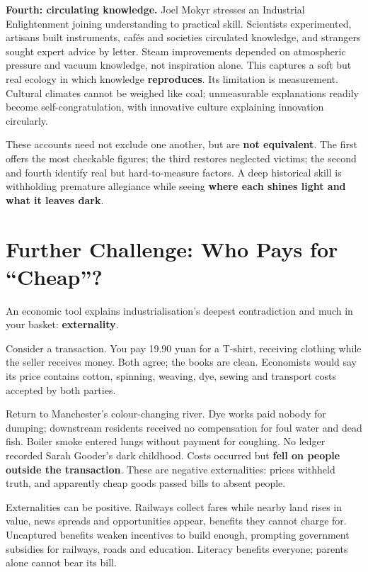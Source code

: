\textbf{Fourth: circulating knowledge.} Joel Mokyr stresses an Industrial Enlightenment joining understanding to practical skill. Scientists experimented, artisans built instruments, cafés and societies circulated knowledge, and strangers sought expert advice by letter. Steam improvements depended on atmospheric pressure and vacuum knowledge, not inspiration alone. This captures a soft but real ecology in which knowledge \textbf{reproduces}. Its limitation is measurement. Cultural climates cannot be weighed like coal; unmeasurable explanations readily become self-congratulation, with innovative culture explaining innovation circularly.

These accounts need not exclude one another, but are \textbf{not equivalent}. The first offers the most checkable figures; the third restores neglected victims; the second and fourth identify real but hard-to-measure factors. A deep historical skill is withholding premature allegiance while seeing \textbf{where each shines light and what it leaves dark}.

\section[Further Challenge: Paying for Cheapness]{Further Challenge: Who Pays for ``Cheap''?}
An economic tool explains industrialisation's deepest contradiction and much in your basket: \textbf{externality}.

Consider a transaction. You pay 19.90 yuan for a T-shirt, receiving clothing while the seller receives money. Both agree; the books are clean. Economists would say its price contains cotton, spinning, weaving, dye, sewing and transport costs accepted by both parties.

Return to Manchester's colour-changing river. Dye works paid nobody for dumping; downstream residents received no compensation for foul water and dead fish. Boiler smoke entered lungs without payment for coughing. No ledger recorded Sarah Gooder's dark childhood. Costs occurred but \textbf{fell on people outside the transaction}. These are negative externalities: prices withheld truth, and apparently cheap goods passed bills to absent people.

Externalities can be positive. Railways collect fares while nearby land rises in value, news spreads and opportunities appear, benefits they cannot charge for. Uncaptured benefits weaken incentives to build enough, prompting government subsidies for railways, roads and education. Literacy benefits everyone; parents alone cannot bear its bill.

